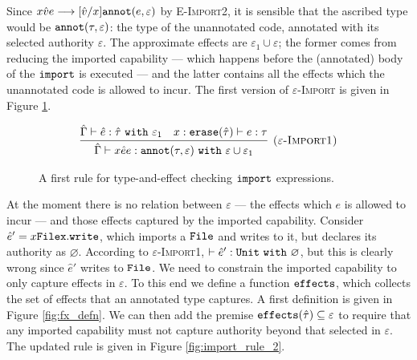 Since ${x}{\hat v}{e} \longrightarrow [\hat v/x]\mathtt{annot}(e, \varepsilon)$ by \textsc{E-Import2}, it is sensible that the ascribed type would be $\mathtt{annot}(\tau, \varepsilon)$: the type of the unannotated code, annotated with its selected authority $\varepsilon$. The approximate effects are $\varepsilon_1 \cup \varepsilon$; the former comes from reducing the imported capability --- which happens before the (annotated) body of the $\mathtt{import}$ is executed --- and the latter contains all the effects which the unannotated code is allowed to incur. The first version of \textsc{$\varepsilon$-Import} is given in Figure \ref{fig:import_rule_1}.


\begin{figure}[h]

\fbox{$\tau <: \tau$}

\[
\begin{array}{c}

\infer[\textsc{($\varepsilon$-Import1)}]
	{ \hat \Gamma \vdash {x}{\hat e}{e}: \kwa{annot}(\tau, \varepsilon)~\kw{with} \varepsilon \cup \varepsilon_1 }
	{ \hat \Gamma \vdash \hat e: \hat \tau~\kw{with} \varepsilon_1 & x: \kwa{erase}(\hat \tau) \vdash e: \tau }

\end{array}
\]
\vspace{-7pt}
\caption{A first rule for type-and-effect checking $\mathtt{import}$ expressions.}
\label{fig:import_rule_1}
\end{figure}

At the moment there is no relation between $\varepsilon$ --- the effects which $e$ is allowed to incur --- and those effects captured by the imported capability. Consider $\hat e' = {x}{\mathtt{File}}{\mathtt{x.write}}$, which imports a $\mathtt{File}$ and writes to it, but declares its authority as $\varnothing$. According to \textsc{$\varepsilon$-Import1}, $\vdash \hat e': \mathtt{Unit}~\mathtt{with}~ \varnothing$, but this is clearly wrong since $\hat e'$ writes to $\mathtt{File}$. We need to constrain the imported capability to only capture effects in $\varepsilon$. To this end we define a function $\mathtt{effects}$, which collects the set of effects that an annotated type captures. A first definition is given in Figure \ref{fig:fx_defn}. We can then add the premise $\mathtt{effects}(\hat \tau) \subseteq \varepsilon$ to require that any imported capability must not capture authority beyond that selected in $\varepsilon$. The updated rule is given in Figure \ref{fig:import_rule_2}.

